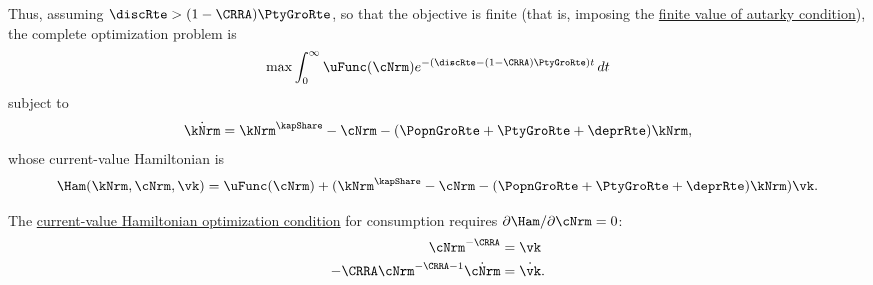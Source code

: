 \documentclass{econark}
\begin{document}
Thus, assuming $\discRte > (1-\CRRA) \PtyGroRte$, so that the objective is finite (that is, imposing the \href{https://llorracc.github.io/BufferStockTheory/#pffvac}{finite value of autarky condition}), the complete optimization problem
is
\begin{equation}
  \max \int_{0}^{\infty} \uFunc(\cNrm) e^{-(\discRte - (1-\CRRA)\PtyGroRte) t}\,dt
\end{equation}
subject to
\begin{equation}
  \dot{\kNrm} = \kNrm^{\kapShare}-\cNrm-(\PopnGroRte+\PtyGroRte+\deprRte)\kNrm,
\end{equation}
whose current-value Hamiltonian is
\begin{equation}
  \Ham(\kNrm,\cNrm,\vk) = \uFunc(\cNrm) + (\kNrm^{\kapShare} - \cNrm - (\PopnGroRte+\PtyGroRte+\deprRte)\kNrm)\vk.
\end{equation}

The \href{https://en.wikipedia.org/wiki/Hamiltonian_(control_theory)#Example:_Ramsey\%E2\%80\%93Cass\%E2\%80\%93Koopmans_model}{current-value Hamiltonian optimization condition} for consumption requires $\partial
\Ham/\partial \cNrm = 0$:
\begin{equation}\begin{gathered}\begin{aligned}
  \cNrm^{-\CRRA} & =  \vk  \label{eq:RCK-H1A} \\
  -\CRRA \cNrm^{-\CRRA-1}\dot{\cNrm} & =  \dot{\vk}
                                       .
\end{aligned}\end{gathered}\end{equation}
\end{document}
